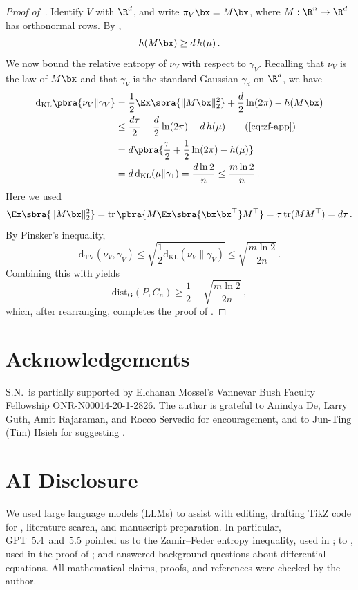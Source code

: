 \documentclass[11pt]{article}
\newcommand{\dG}{\mathrm{dist}_{\mathrm{G}}}
\newcommand{\dtv}{\mathrm{d}_{\mathrm{TV}}}
\newcommand{\dkl}{\mathrm{d}_{\mathrm{KL}}}
\begin{document}
\begin{proof}[Proof of~]
	Identify $V$ with $\R^d$, and write $\pi_V\bx=M\bx$, where
	$M:\R^n\to\R^d$ has orthonormal rows.  By
	,
	\begin{equation} \label{eq:zf-app}
		h(M\bx)\geq d\,h(\mu)\,.
	\end{equation}
	We now bound the relative entropy of $\nu_V$ with respect to $\gamma_V$.
	Recalling that $\nu_V$ is the law of $M\bx$ and that $\gamma_V$ is the standard Gaussian $\gamma_d$ on $\R^d$, we have 
	\begin{align*}
		\dkl\pbra{\nu_V\|\gamma_V}
		&=
		\frac{1}{2}\Ex\sbra{\|M\bx\|_2^2}
		+\frac d2\ln(2\pi)
		-h(M\bx) \\
		&\leq
		\frac{d\tau}{2}
		+\frac d2\ln(2\pi)
		-d\,h(\mu) \tag{\Cref{eq:zf-app}} \\
		&=
		d\pbra{
			\frac{\tau}{2}
			+\frac{1}{2}\ln(2\pi)
			-h(\mu)
		} \\
		&=
		d\,\dkl(\mu\|\gamma_1)
		=
		\frac{d\ln 2}{n}
		\leq
		\frac{m\ln 2}{n}\,.
	\end{align*}
	Here we used
	\[
		\Ex\sbra{\|M\bx\|_2^2}
		=
		\operatorname{tr}\pbra{M\Ex\sbra{\bx\bx^\top}M^\top}
		=
		\tau\operatorname{tr}(MM^\top)
		=
		d\tau\,.
	\]
	By Pinsker's inequality, 
	\[
		\dtv(\nu_V,\gamma_V)
		\leq
		\sqrt{\frac{1}{2}\dkl(\nu_V\|\gamma_V)}
		\leq
		\sqrt{\frac{m\ln 2}{2n}}\,.
	\]
	Combining this with  yields
	\[
		\dG(P, C_n) 
		\geq
		\frac{1}{2}-\sqrt{\frac{m\ln 2}{2n}}\,,
	\]
	which, after rearranging, completes the proof of . 
\end{proof}


\section*{Acknowledgements} 
 
S.N.~is partially supported by Elchanan Mossel's Vannevar Bush Faculty Fellowship ONR-N00014-20-1-2826.
The author is grateful to Anindya De, Larry Guth, Amit Rajaraman, and Rocco Servedio for encouragement, and to Jun-Ting (Tim) Hsieh for suggesting . 

\section*{AI Disclosure} 

We used large language models (LLMs) to assist with editing, drafting TikZ code for , literature search, and manuscript preparation.  
In particular, GPT~5.4~and~5.5 pointed us to the Zamir--Feder entropy inequality, used in ; to \cite[Problem~3.19(d)]{rvh-notes}, used in the proof of ; and answered background questions about differential equations.
All mathematical claims, proofs, and references were checked by the author.  
\end{document}
